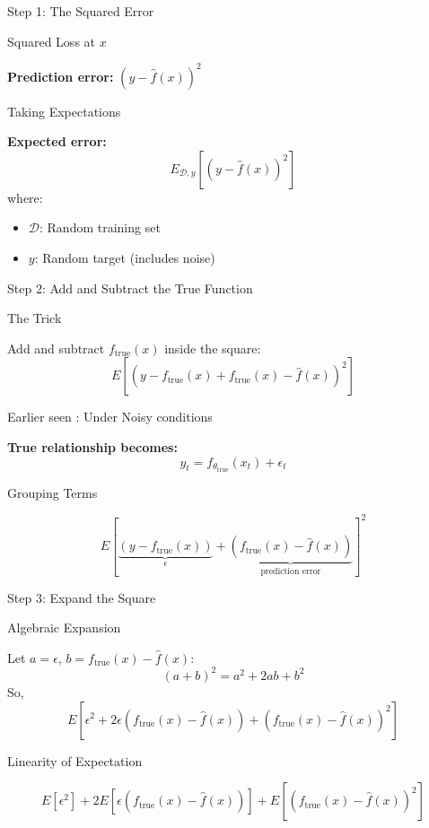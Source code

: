 \documentclass[10pt]{beamer}
\begin{document}
\begin{frame}{Step 1: The Squared Error}
\small
\begin{definitionbox}{Squared Loss at $x$}
\raggedright
\textbf{Prediction error:} $(y - \hat{f}(x))^2$
\end{definitionbox}

\begin{keypointsbox}{Taking Expectations}
\raggedright
\textbf{Expected error:}
$$E_{\mathcal{D}, y}[(y - \hat{f}(x))^2]$$
where:
\begin{itemize}
\item $\mathcal{D}$: Random training set
\item $y$: Random target (includes noise)
\end{itemize}
\end{keypointsbox}
\end{frame}

\begin{frame}{Step 2: Add and Subtract the True Function}
\small
\begin{examplebox}{The Trick}
\raggedright
Add and subtract $f_{\text{true}}(x)$ inside the square:
$$E[(y - f_{\text{true}}(x) + f_{\text{true}}(x) - \hat{f}(x))^2]$$
\end{examplebox}

\begin{keypointsbox}{Earlier seen : Under Noisy conditions}
\raggedright
\textbf{True relationship becomes:}
$$y_t = f_{\theta_{\text{true}}}(x_t) + \epsilon_t$$
\end{keypointsbox}
\begin{definitionbox}{Grouping Terms}
\raggedright
$$E\left[\underbrace{(y - f_{\text{true}}(x))}_{\epsilon} + \underbrace{(f_{\text{true}}(x) - \hat{f}(x))}_{\text{prediction error}}\right]^2$$
\end{definitionbox}
\end{frame}

\begin{frame}{Step 3: Expand the Square}
\small
\begin{examplebox}{Algebraic Expansion}
\raggedright
Let $a = \epsilon$, $b = f_{\text{true}}(x) - \hat{f}(x)$:
$$(a + b)^2 = a^2 + 2ab + b^2$$
So,
$$E[\epsilon^2 + 2\epsilon(f_{\text{true}}(x) - \hat{f}(x)) + (f_{\text{true}}(x) - \hat{f}(x))^2]$$
\end{examplebox}

\begin{keypointsbox}{Linearity of Expectation}
\raggedright
$$E[\epsilon^2] + 2E[\epsilon(f_{\text{true}}(x) - \hat{f}(x))] + E[(f_{\text{true}}(x) - \hat{f}(x))^2]$$
\end{keypointsbox}
\end{frame}
\end{document}
